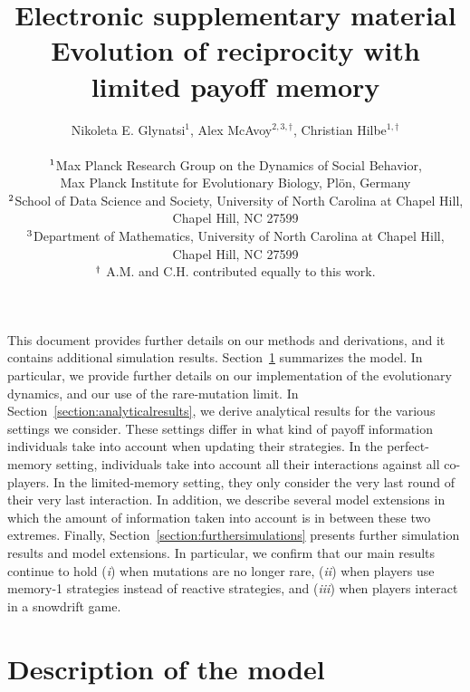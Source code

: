 \documentclass[11pt]{article}
\title{{ \sffamily \LARGE Electronic supplementary material}\\{\bf \sffamily \LARGE Evolution of reciprocity with limited payoff memory}}
\date{}
\author{\parbox[c]{16cm}{\centering \onehalfspacing 
Nikoleta E. Glynatsi$^1$,  Alex McAvoy$^{2,3, \dagger}$, Christian Hilbe$^{1, \dagger}$\\ \quad \\
$^{\rm 1}$Max Planck Research Group on the Dynamics of Social Behavior,\\ Max Planck Institute for Evolutionary Biology, Pl\"{o}n, Germany \\
$^{\rm 2}$School of Data Science and Society, University of North Carolina at Chapel Hill,\\ Chapel Hill, NC 27599 \\
$^{\rm 3}$Department of Mathematics, University of North Carolina at Chapel Hill,\\ Chapel Hill, NC 27599 \\
$^{\rm \dagger}$ A.M. and C.H. contributed equally to this work.}}
\theoremstyle{plainCl1}
\theoremstyle{plainCl2}
\begin{document}
\maketitle



\noindent
This document provides further details on our methods and derivations, and it contains additional simulation results. 
Section~\ref{section:model} summarizes the model. 
In particular, we provide further details on our implementation of the evolutionary dynamics, and our use of the rare-mutation limit. 
In Section~\ref{section:analyticalresults}, we derive analytical results for the various settings we consider.
These settings differ in what kind of payoff information individuals take into account when updating their strategies. 
In the perfect-memory setting, individuals take into account all their interactions against all co-players.
In the limited-memory setting, they only consider the very last round of their very last interaction.  
In addition, we describe several model extensions in which the amount of information taken into account is in between these two extremes. 
Finally, Section~\ref{section:furthersimulations} presents further simulation results and model extensions. 
In particular, we confirm that our main results continue to hold ({\it i}) when mutations are no longer rare, ({\it ii}) when players use memory-1 strategies instead of reactive strategies, and ({\it iii}) when players interact in a snowdrift game. 




\section{Description of the model}\label{section:model}

\end{document}
